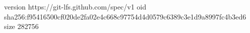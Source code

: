 version https://git-lfs.github.com/spec/v1
oid sha256:f95416500cf020de2fa02e4c668c97754d4d0579c6389c3e1d9a8997fc4b3ed6
size 282756

